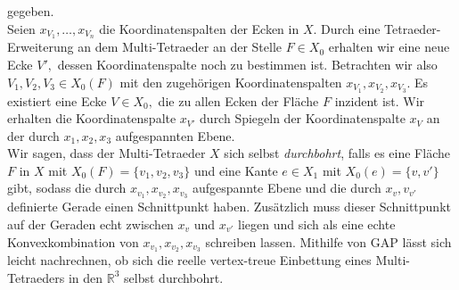 \documentclass[12pt,titlepage,twoside,cleardoublepage]{article}
\theoremstyle{nummermitklammern}
\numberwithin{equation}{section}
\begin{document}
gegeben.\\
Seien $x_{V_1},\ldots,x_{V_n}$ die Koordinatenspalten der Ecken in $X.$
Durch eine Tetraeder-Erweiterung an dem Multi-Tetraeder an der Stelle $F\in X_0$ erhalten wir eine neue Ecke $V',$ dessen Koordinatenspalte noch zu bestimmen ist. 
Betrachten wir also $V_1,V_2,V_3\in X_0(F)$ mit den zugehörigen Koordinatenspalten $x_{V_1},x_{V_2},x_{V_3}.$ Es existiert eine Ecke $V\in X_0,$ die zu allen Ecken der Fläche $F$ inzident ist. Wir erhalten die Koordinatenspalte $x_{V'}$ durch Spiegeln der Koordinatenspalte $x_V$ an der durch $x_{1},x_{2},x_{3}$ aufgespannten Ebene. \\
Wir sagen, dass der Multi-Tetraeder $X$ sich selbst \emph{durchbohrt}, falls es eine Fläche $F$ in $X$ mit $X_0(F)=\{v_1,v_2,v_3\}$ und eine Kante $e\in X_1$ mit $X_0(e)=\{v,v'\}$ gibt, sodass die durch $x_{v_1},x_{v_2},x_{v_3}$ aufgespannte Ebene und die durch $x_v,v_{v'}$ definierte Gerade  einen Schnittpunkt haben. Zusätzlich muss dieser Schnittpunkt auf der Geraden echt zwischen $x_{v}$ und $x_{v'}$ liegen und sich als eine echte Konvexkombination von $x_{v_1},x_{v_2},x_{v_3}$ schreiben lassen. 
Mithilfe von GAP lässt sich leicht nachrechnen, ob sich die reelle vertex-treue Einbettung eines Multi-Tetraeders in den $\mathbb{R}^3$ selbst durchbohrt.
\end{document}
